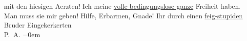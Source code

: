 \begin{ledgroupsized}[t]{13cm}
                   mit den hiesigen Aerzten! Ich  meine \uline{volle bedingungslose
                  ganze} Freiheit haben. Man muss sie mir 
               geben! Hilfe, Erbarmen, Gnade!\pend
           \pstart
           Ihr durch einen \uline{feig-stupiden}{ }Bruder Eingekerkerten{\\[\baselineskip]}\spacefill\mbox{P. A.}\pend
           \leftskip=0em{}
         
         \endnumbering{}\end{ledgroupsized}  \newcommand{\dateiname}{L02124}\newcommand{\titel}{Peter Altenberg an Arthur Schnitzler, [19.? 4. 1913]}\newcommand{\editorInnen}{Martin Anton Müller und Gerd-Hermann Susen}
      